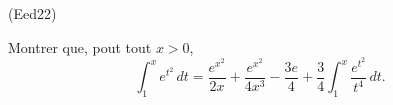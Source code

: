 \begin{tiny}(Eed22)\end{tiny} Montrer que, pout tout $x > 0$,
\[
 \int_1^x e^{t^2}\,dt 
 = \frac{e^{x^2}}{2x} + \frac{e^{x^2}}{4x^3} - \frac{3e}{4} 
 + \frac{3}{4}\int_1^x \frac{e^{t^2}}{t^4}\, dt .
\]
